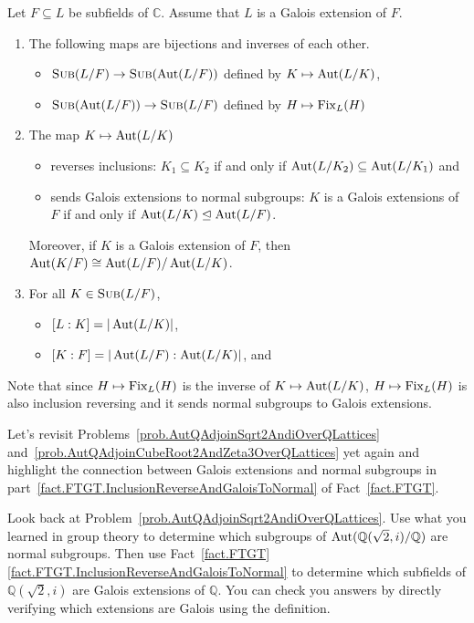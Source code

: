 \begin{fact}\label{fact.FTGT}
Let $F\subseteq L$ be subfields of $\mathbb{C}$. Assume that $L$ is a Galois extension of $F$. \begin{enumerate}
\item The following maps are bijections and inverses of each other.
\begin{itemize}
\item $\operatorname{\textsc{Sub}}(L/F)\to \operatorname{\textsc{Sub}}(\operatorname{Aut}(L/F))$ defined by $K\mapsto \operatorname{Aut}(L/K)$,
\item $\operatorname{\textsc{Sub}}(\operatorname{Aut}(L/F))\to \operatorname{\textsc{Sub}}(L/F)$ defined by $H\mapsto \operatorname{Fix}_L(H)$
\end{itemize} 
\item\label{fact.FTGT.InclusionReverseAndGaloisToNormal} The map $K\mapsto \operatorname{Aut}(L/K)$ 
\begin{itemize}
\item reverses inclusions: $K_1\subseteq K_2$ if and only if $\operatorname{Aut}(L/K_2) \subseteq \operatorname{Aut}(L/K_1)$ and
\item sends Galois extensions to normal subgroups: $K$ is a Galois extensions of $F$ if and only if $\operatorname{Aut}(L/K)\trianglelefteq \operatorname{Aut}(L/F)$.
\end{itemize}
Moreover, if $K$ is a Galois extension of $F$, then $\operatorname{Aut}(K/F)\cong \operatorname{Aut}(L/F)/\operatorname{Aut}(L/K)$.
\item For all $K\in \operatorname{\textsc{Sub}}(L/F)$, 
\begin{itemize}\label{fact.FTGT.DegreeMatchesIndex}
\item $[L:K] = |\operatorname{Aut}(L/K)|$,
\item $[K:F] = |\operatorname{Aut}(L/F):\operatorname{Aut}(L/K)|$, and 
\end{itemize}
\end{enumerate}
\end{fact}

Note that since $H\mapsto \operatorname{Fix}_L(H)$ is the inverse of $K\mapsto \operatorname{Aut}(L/K)$, $H\mapsto \operatorname{Fix}_L(H)$ is also inclusion reversing and it sends normal subgroups to Galois extensions. 

Let's revisit Problems~\ref{prob.AutQAdjoinSqrt2AndiOverQLattices} and~\ref{prob.AutQAdjoinCubeRoot2AndZeta3OverQLattices} yet again and highlight the connection between Galois extensions and normal subgroups  in part~\ref{fact.FTGT.InclusionReverseAndGaloisToNormal} of Fact~\ref{fact.FTGT}. 

\begin{problem}\label{prob.AutQAdjoinSqrt2AndiOverQNormalSubs}
Look back at Problem~\ref{prob.AutQAdjoinSqrt2AndiOverQLattices}. Use what you learned in group theory to determine which subgroups of $\operatorname{Aut}(\mathbb{Q}(\sqrt{2},i)/\mathbb{Q})$ are normal subgroups. Then use Fact~\ref{fact.FTGT}\ref{fact.FTGT.InclusionReverseAndGaloisToNormal} to determine which subfields of $\mathbb{Q}(\sqrt{2},i)$ are Galois extensions of $\mathbb{Q}$. You can check you answers by directly verifying which extensions are Galois using the definition.
\end{problem}


